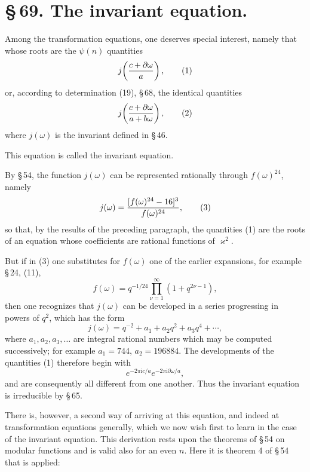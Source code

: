 \documentclass[11pt]{article}
\providecommand{\ii}{\mathrm{i}}
\begin{document}
\section*{\S\,69. The invariant equation.}

Among the transformation equations, one deserves special interest, namely that whose roots are the $\psi(n)$ quantities
\begin{equation}
j\!\left({c+\partial\omega\over a}\right),
\tag{1}
\end{equation}
or, according to determination (19), \S\,68, the identical quantities
\begin{equation}
j\!\left({c+\partial\omega\over a+b\omega}\right),
\tag{2}
\end{equation}
where $j(\omega)$ is the invariant defined in \S\,46.

This equation is called the invariant equation.

By \S\,54, the function $j(\omega)$ can be represented rationally through $f(\omega)^{24}$, namely
\begin{equation}
j(\omega)={[f(\omega)^{24}-16]^3\over f(\omega)^{24}},
\tag{3}
\end{equation}
so that, by the results of the preceding paragraph, the quantities (1) are the roots of an equation whose coefficients are rational functions of $\varkappa^2$.

But if in (3) one substitutes for $f(\omega)$ one of the earlier expansions, for example \S\,24, (11),
\[
f(\omega)=q^{-1/24}\prod_{\nu=1}^{\infty}(1+q^{2\nu-1}),
\]
then one recognizes that $j(\omega)$ can be developed in a series progressing in powers of $q^2$, which has the form
\begin{equation}
j(\omega)=q^{-2}+a_1+a_2q^2+a_3q^4+\cdots,
\tag{4}
\end{equation}
where $a_1,a_2,a_3,\ldots$ are integral rational numbers which may be computed successively; for example $a_1=744$, $a_2=196884$. The developments of the quantities (1) therefore begin with
\begin{equation}
e^{-2\pi\ii c/a}e^{-2\pi\ii\partial\omega/a},
\tag{5}
\end{equation}
and are consequently all different from one another. Thus the invariant equation is irreducible by \S\,65.

There is, however, a second way of arriving at this equation, and indeed at transformation equations generally, which we now wish first to learn in the case of the invariant equation. This derivation rests upon the theorems of \S\,54 on modular functions and is valid also for an even $n$. Here it is theorem 4 of \S\,54 that is applied:
\end{document}
